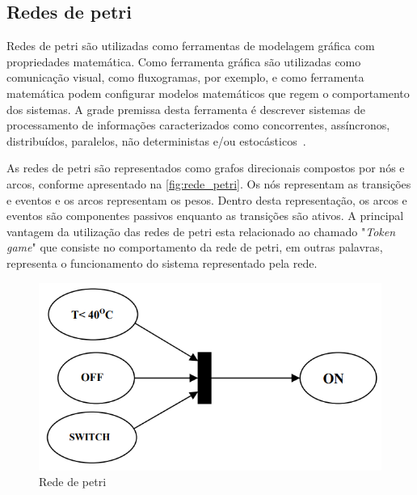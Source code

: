 \subsection{Redes de petri}



Redes de petri são utilizadas como ferramentas de modelagem gráfica com propriedades matemática. Como ferramenta gráfica são utilizadas como comunicação visual, como fluxogramas, por exemplo, e como ferramenta matemática podem configurar modelos matemáticos que regem o comportamento dos sistemas. A grade premissa desta ferramenta é descrever sistemas de processamento de informações caracterizados como concorrentes, assíncronos, distribuídos, paralelos, não deterministas e/ou estocásticos~\cite{murata1989petri}.

\par
As redes de petri são representados como grafos direcionais compostos por nós e arcos, conforme apresentado na \autoref{fig:rede_petri}. Os nós representam as transições e eventos e os arcos representam os pesos. Dentro desta representação, os arcos e eventos são componentes passivos enquanto as transições são ativos. A principal vantagem da utilização das redes de petri esta relacionado ao chamado "\textit{Token game}" que consiste no comportamento da rede de petri, em outras palavras, representa o funcionamento do sistema representado pela rede\cite{halder2006}.

\begin{figure}[htb]
	\begin{center}
    \caption{\label{fig:rede_petri}Rede de petri}
	\includegraphics[scale=0.40]{Figuras/rede_petri.png}
	\end{center}
\end{figure}


